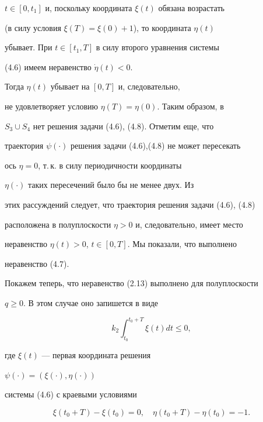 $t\in [0, t_1]$ и, поскольку координата $\xi(t)$ обязана возрастать


(в силу условия $\xi(T)=\xi(0) + 1$), то координата $\eta(t)$


убывает. При $t\in [t_1,T]$ в силу второго уравнения системы


(4.6) имеем неравенство $\Dot \eta(t) < 0$.


Тогда $\eta(t)$ убывает на $[0,T]$ и, следовательно,


не удовлетворяет условию $\eta(T)=\eta(0)$. Таким образом, в


$S_3\cup S_4$ нет решения задачи (4.6), (4.8). Отметим еще, что


траектория $\psi(\cdot)$ решения задачи (4.6),(4.8) не может пересекать


ось $\eta=0$, т.\,к. в силу периодичности координаты


$\eta(\cdot)$ таких пересечений было бы не менее двух. Из


этих рассуждений следует, что траектория решения задачи (4.6), (4.8)


расположена в полуплоскости $\eta > 0$ и, следовательно, имеет место


неравенство $\eta(t) > 0$, $t\in [0,T]$. Мы показали, что выполнено


неравенство (4.7).





Покажем теперь, что неравенство (2.13) выполнено для полуплоскости


$q\ge 0$. В этом случае оно запишется в виде


%


\begin{equation}


k_2\int_{t_0}^{t_0+T}\xi(t) dt \le 0,


\end{equation}


%


где $\xi(t)$ --- первая координата решения


$\psi(\cdot)=(\xi(\cdot),\eta(\cdot))$


системы (4.6) с краевыми условиями


%


\begin{equation}


\xi(t_0+T) - \xi(t_0) = 0,\quad \eta(t_0+T) - \eta(t_0) = -1.


\end{equation}


